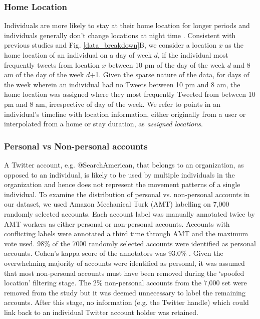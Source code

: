\subsubsection{Home Location}
Individuals are more likely to stay at their home location for longer periods and individuals generally don't change locations at night time \cite{hossain2016precise}.
Consistent with previous studies and Fig. \ref{data_breakdown}B, we consider a location $x$ as the home location of an individual on a day of week $d$, if the individual most frequently tweets from location $x$ between 10 pm of the day of the week $d$ and 8 am of the day of the week $d$+1. Given the sparse nature of the data, for days of the week wherein an individual had no Tweets between 10 pm and 8 am, the home location was assigned where they most frequently Tweeted from between 10 pm and 8 am, irrespective of day of the week. We refer to points in an individual's timeline with location information, either originally from a user or interpolated from a home or stay duration, as \emph{assigned locations}.
\subsubsection{Personal vs Non-personal accounts}
A Twitter account, e.g. @SearchAmerican, that belongs to an organization, as opposed to an individual, is likely to be used by multiple individuals in the organization and hence does not represent the movement patterns of a single individual. To examine the distribution of personal vs. non-personal accounts in our dataset, we used Amazon Mechanical Turk (AMT) labelling on 7,000 randomly selected accounts. Each account label was manually annotated twice by AMT workers as either personal or non-personal accounts. Accounts with conflicting labels were annotated a third time through AMT and the maximum vote used. 98\% of the 7000 randomly selected accounts were identified as personal accounts. Cohen's kappa score of the annotators was 93.0\% \cite{78}. Given the overwhelming majority of accounts were identified as personal, it was assumed that most non-personal accounts must have been removed during the `spoofed location' filtering stage. The 2\% non-personal accounts from the 7,000 set were removed from the study but it was deemed unnecessary to label the remaining accounts. After this stage, no information (e.g. the Twitter handle) which could link back to an individual Twitter account holder was retained. 

